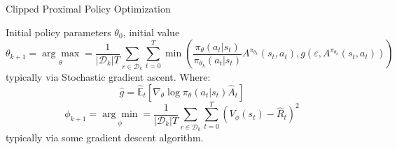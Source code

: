 \begin{algorithm}[H]
    \caption{Clipped Proximal Policy Optimization}
    \label{alg:ppo}
    \begin{algorithmic}[1]
        \REQUIRE Initial policy parameters $\theta _0$, initial value
        $$
            \theta _{k + 1} = \underset{\theta}{\arg\max} = \frac{1}{|\mathcal{D} _k|T} \sum _{r \in \mathcal{D} _k} \sum _{t = 0} ^{T} \min \left( \frac{\pi _{\theta} (a _t | s _t)}{\pi _{\theta_k} (a _t | s _t)} A ^{\pi _{\theta_k}} (s _t, a _t), g(\varepsilon, A ^{\pi _{\theta_k}}(s _t, a _t)) \right)
        $$
        typically via Stochastic gradient ascent. Where:
        $$
            \hat{g} = \hat{\mathbb{E}} _t \left[\nabla _{\theta}\log\pi _{\theta}(a _t | s _t) \hat{A} _t\right]
        $$
        $$
            \phi _{k + 1} = \underset{\phi}{\arg\min} = \frac{1}{|\mathcal{D} _k|T} \sum _{r \in \mathcal{D} _k} \sum _{t = 0} ^{T} \left(V _{\phi}(s _t) - \hat{R} _t \right)^2
        $$
        typically via some gradient descent algorithm.
        \ENDFOR
    \end{algorithmic}
\end{algorithm}
